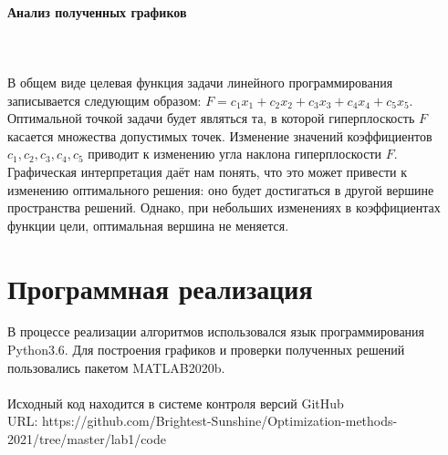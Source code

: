 \documentclass{article}
\begin{document}
\begin{figure}[H]
\label{fig:image}
\end{figure}

\begin{figure}[H]
\label{fig:image}
\end{figure}


\noindent \paragraph{Анализ полученных графиков} 
\label{gr}
\\\\
В общем виде целевая функция задачи линейного программирования записывается следующим образом: $F=c_1x_1 + c_2x_2 + c_3x_3 + c_4x_4 + c_5x_5$.\\
Оптимальной точкой задачи будет являться та, в которой гиперплоскость $F$ касается множества допустимых точек. Изменение значений коэффициентов $c_1, c_2, c_3, c_4, c_5$ приводит к изменению угла наклона гиперплоскости $F$. Графическая интерпретация даёт нам понять, что это может привести к изменению оптимального решения: оно будет достигаться в другой вершине пространства решений. Однако, при небольших изменениях в коэффициентах функции цели, оптимальная вершина не меняется.

\section{Программная реализация}
\noindent В процессе реализации алгоритмов использовался язык программирования Python3.6. Для построения графиков и  проверки полученных решений пользовались пакетом MATLAB2020b.
\\\\
\noindent Исходный код находится в системе контроля версий GitHub 
\\
URL: https://github.com/Brightest-Sunshine/Optimization-methods-2021/tree/master/lab1/code
\end{document}
